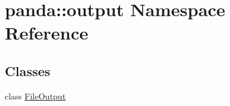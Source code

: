 \hypertarget{namespacepanda_1_1output}{
\section{panda::output Namespace Reference}
\label{namespacepanda_1_1output}
}
\subsection*{Classes}
\begin{DoxyCompactItemize}
\item 
class \hyperlink{classpanda_1_1output_1_1FileOutput}{FileOutput}
\end{DoxyCompactItemize}
